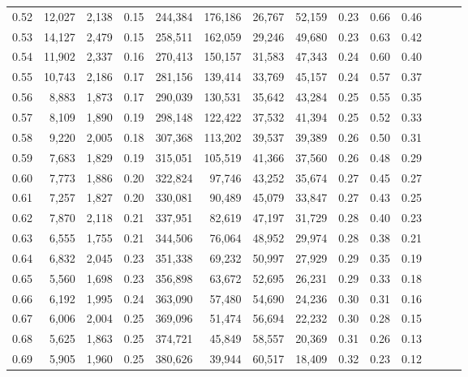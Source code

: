 \begin{tabular}{rrrrrrrrrrrrrr}
0.52 &  12,027 &  2,138 &  0.15 &  244,384 &  176,186 &  26,767 &  52,159 &  0.23 &  0.66 &      0.46 \\
0.53 &  14,127 &  2,479 &  0.15 &  258,511 &  162,059 &  29,246 &  49,680 &  0.23 &  0.63 &      0.42 \\
0.54 &  11,902 &  2,337 &  0.16 &  270,413 &  150,157 &  31,583 &  47,343 &  0.24 &  0.60 &      0.40 \\
0.55 &  10,743 &  2,186 &  0.17 &  281,156 &  139,414 &  33,769 &  45,157 &  0.24 &  0.57 &      0.37 \\
0.56 &   8,883 &  1,873 &  0.17 &  290,039 &  130,531 &  35,642 &  43,284 &  0.25 &  0.55 &      0.35 \\
0.57 &   8,109 &  1,890 &  0.19 &  298,148 &  122,422 &  37,532 &  41,394 &  0.25 &  0.52 &      0.33 \\
0.58 &   9,220 &  2,005 &  0.18 &  307,368 &  113,202 &  39,537 &  39,389 &  0.26 &  0.50 &      0.31 \\
0.59 &   7,683 &  1,829 &  0.19 &  315,051 &  105,519 &  41,366 &  37,560 &  0.26 &  0.48 &      0.29 \\
0.60 &   7,773 &  1,886 &  0.20 &  322,824 &   97,746 &  43,252 &  35,674 &  0.27 &  0.45 &      0.27 \\
0.61 &   7,257 &  1,827 &  0.20 &  330,081 &   90,489 &  45,079 &  33,847 &  0.27 &  0.43 &      0.25 \\
0.62 &   7,870 &  2,118 &  0.21 &  337,951 &   82,619 &  47,197 &  31,729 &  0.28 &  0.40 &      0.23 \\
0.63 &   6,555 &  1,755 &  0.21 &  344,506 &   76,064 &  48,952 &  29,974 &  0.28 &  0.38 &      0.21 \\
0.64 &   6,832 &  2,045 &  0.23 &  351,338 &   69,232 &  50,997 &  27,929 &  0.29 &  0.35 &      0.19 \\
0.65 &   5,560 &  1,698 &  0.23 &  356,898 &   63,672 &  52,695 &  26,231 &  0.29 &  0.33 &      0.18 \\
0.66 &   6,192 &  1,995 &  0.24 &  363,090 &   57,480 &  54,690 &  24,236 &  0.30 &  0.31 &      0.16 \\
0.67 &   6,006 &  2,004 &  0.25 &  369,096 &   51,474 &  56,694 &  22,232 &  0.30 &  0.28 &      0.15 \\
0.68 &   5,625 &  1,863 &  0.25 &  374,721 &   45,849 &  58,557 &  20,369 &  0.31 &  0.26 &      0.13 \\
0.69 &   5,905 &  1,960 &  0.25 &  380,626 &   39,944 &  60,517 &  18,409 &  0.32 &  0.23 &      0.12 \\

\end{tabular}
